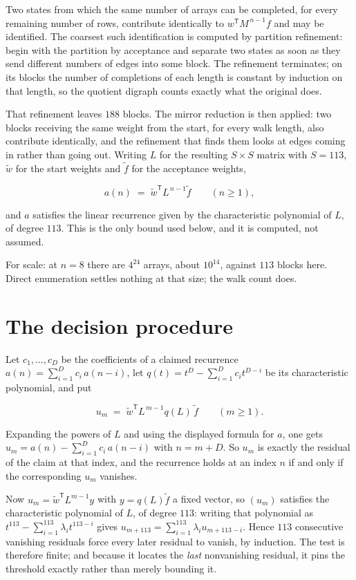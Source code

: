 \documentclass[11pt]{article}
\theoremstyle{definition}
\begin{document}
Two states from which the same number of arrays can be completed, for every remaining number of rows, contribute identically to $w^{\mathsf T}M^{\,n-1}f$ and may be identified. The coarsest such identification is computed by partition refinement: begin with the partition by acceptance and separate two states as soon as they send different numbers of edges into some block. The refinement terminates; on its blocks the number of completions of each length is constant by induction on that length, so the quotient digraph counts exactly what the original does.

That refinement leaves $188$ blocks. The mirror reduction is then applied: two blocks receiving the same weight from the start, for every walk length, also contribute identically, and the refinement that finds them looks at edges coming in rather than going out. Writing $L$ for the resulting $S \times S$ matrix with $S = 113$, $\tilde w$ for the start weights and $\tilde f$ for the acceptance weights,

\[a(n) \;=\; \tilde w^{\mathsf T} L^{\,n-1} \tilde f \qquad (n \ge 1),\]

and $a$ satisfies the linear recurrence given by the characteristic polynomial of $L$, of degree $113$. This is the only bound used below, and it is computed, not assumed.

For scale: at $n = 8$ there are $4^{24}$ arrays, about $10^{14}$, against $113$ blocks here. Direct enumeration settles nothing at that size; the walk count does.

\section{The decision procedure}

Let $c_1,\dots,c_D$ be the coefficients of a claimed recurrence $a(n) = \sum_{i=1}^{D} c_i\,a(n-i)$, let $q(t) = t^{D} - \sum_{i=1}^{D} c_i t^{D-i}$ be its characteristic polynomial, and put

\[u_m \;=\; \tilde w^{\mathsf T} L^{\,m-1} q(L)\,\tilde f \qquad (m \ge 1).\]

Expanding the powers of $L$ and using the displayed formula for $a$, one gets $u_m = a(n) - \sum_{i=1}^{D} c_i\,a(n-i)$ with $n = m + D$. So $u_m$ is exactly the residual of the claim at that index, and the recurrence holds at an index $n$ if and only if the corresponding $u_m$ vanishes.

Now $u_m = \tilde w^{\mathsf T} L^{m-1} y$ with $y = q(L)\tilde f$ a fixed vector, so $(u_m)$ satisfies the characteristic polynomial of $L$, of degree $113$: writing that polynomial as $t^{113} - \sum_{i=1}^{113} \lambda_i t^{113-i}$ gives $u_{m+113} = \sum_{i=1}^{113} \lambda_i u_{m+113-i}$. Hence $113$ consecutive vanishing residuals force every later residual to vanish, by induction. The test is therefore finite; and because it locates the {\itshape last} nonvanishing residual, it pins the threshold exactly rather than merely bounding it.
\end{document}
